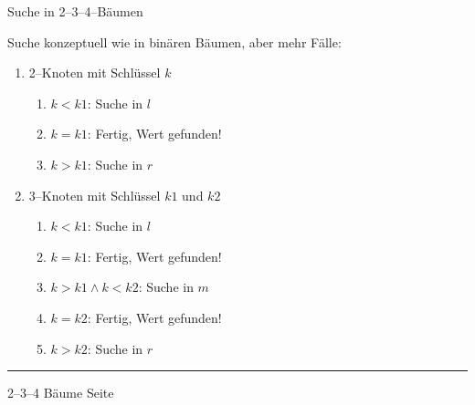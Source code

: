 \begin{slide}{}
\normalsize

\begin{center}
Suche in 2--3--4--B\"aumen
\end{center}
\vspace*{0.5cm}

\footnotesize
Suche konzeptuell wie in bin\"aren B\"aumen, aber mehr F\"alle:
\begin{enumerate}
\item 2--Knoten mit Schl\"ussel $k$

      \hspace*{3cm} 
      \vspace*{-0.7cm}

      \begin{enumerate}
      \item $k < k1$: Suche in $l$
      \item $k = k1$: Fertig, Wert gefunden!
      \item $k > k1$: Suche in $r$
      \end{enumerate}
\item 3--Knoten mit Schl\"ussel $k1$ und $k2$

      \hspace*{3cm} 
      \vspace*{-0.7cm}

      \begin{enumerate}
      \item $k < k1$: Suche in $l$
      \item $k = k1$: Fertig, Wert gefunden!
      \item $k > k1 \wedge k < k2$: Suche in $m$
      \item $k = k2$: Fertig, Wert gefunden!
      \item $k > k2$: Suche in $r$
      \end{enumerate}
\end{enumerate}

\vspace*{\fill}
\tiny \addtocounter{mypage}{1}
\rule{17cm}{1mm}
2--3--4 B\"aume  \hspace*{\fill} Seite 
\end{slide}


